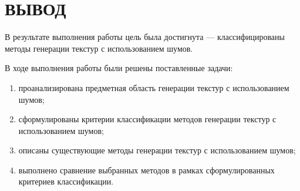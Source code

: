 \chapter*{ВЫВОД}

В результате выполнения работы цель была достигнута --- классифицированы методы генерации текстур с использованием шумов.

В ходе выполнения работы были решены поставленные задачи:
\begin{enumerate}
	\item проанализирована предметная область генерации текстур с использованием шумов;
	\item сформулированы критерии классификации методов генерации текстур с использованием шумов;
	\item описаны существующие методы генерации текстур с использованием шумов;
	\item выполнено сравнение выбранных методов в рамках сформулированных критериев классификации.
\end{enumerate}